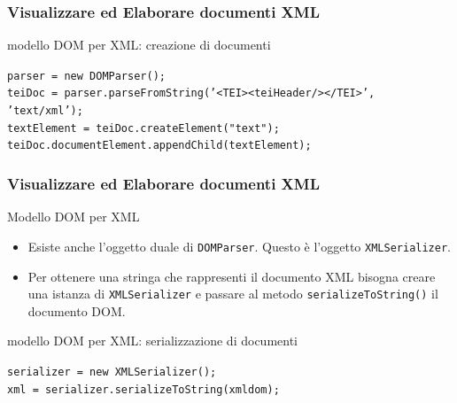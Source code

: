 \begin{frame}
    \frametitle{Visualizzare ed Elaborare documenti XML}
    \addtocounter{nframe}{1}

     \begin{block}{modello DOM per XML: creazione di documenti}
       
        \texttt{parser = new DOMParser();}
        \\\texttt{teiDoc = parser.parseFromString('<TEI><teiHeader/></TEI>', 'text/xml');}
        \\\texttt{textElement = teiDoc.createElement("text");}
        \\\texttt{teiDoc.documentElement.appendChild(textElement);}
        
     \end{block}
     
\end{frame}


\begin{frame}
    \frametitle{Visualizzare ed Elaborare documenti XML}
    \addtocounter{nframe}{1}
    

     \begin{block}{Modello DOM per XML}
        \begin{itemize}
            \item Esiste anche l'oggetto duale di \texttt{DOMParser}. Questo è l'oggetto \texttt{XMLSerializer}.
            \item  Per ottenere una stringa che rappresenti il documento XML bisogna creare una istanza di \texttt{XMLSerializer} e passare al metodo \texttt{serializeToString()} il documento DOM.
        \end{itemize}
        
     \end{block}

     \begin{block}{modello DOM per XML: serializzazione di documenti}
       
        \texttt{serializer = new XMLSerializer();}
        \\\texttt{xml = serializer.serializeToString(xmldom);}
        
     \end{block}
     
\end{frame}

